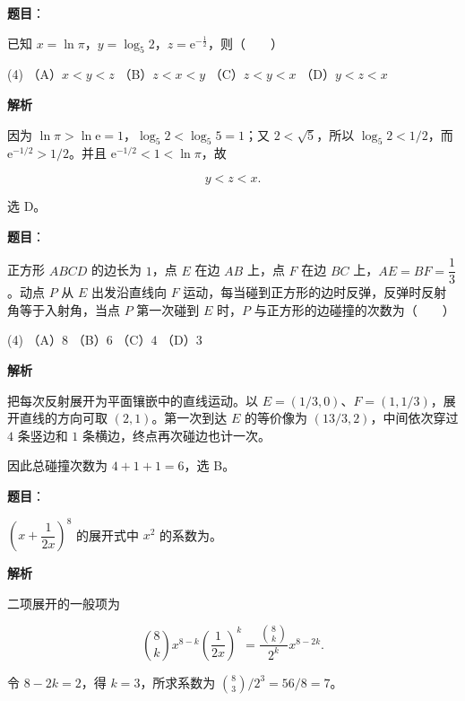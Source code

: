 \begin{answer}

\textbf{题目}：

已知 $x=\ln\pi$，$y=\log_5 2$，$z=\mathrm e^{-\frac12}$，则\mbox{（　　）}

\begin{gkopts}(4)
\task （A）$x<y<z$
\task （B）$z<x<y$
\task （C）$z<y<x$
\task （D）$y<z<x$
\end{gkopts}

\textbf{解析}

因为 $\ln\pi>\ln\mathrm e=1$，$\log_5 2<\log_5 5=1$；又 $2<\sqrt5$，所以 $\log_5 2<1/2$，而 $\mathrm e^{-1/2}>1/2$。并且 $\mathrm e^{-1/2}<1<\ln\pi$，故

\nopagebreak[4]
\[
y<z<x.
\]

选 D。


\end{answer}
\begin{answer}

\textbf{题目}：

正方形 $ABCD$ 的边长为 $1$，点 $E$ 在边 $AB$ 上，点 $F$ 在边 $BC$ 上，$AE=BF=\dfrac13$。动点 $P$ 从 $E$ 出发沿直线向 $F$ 运动，每当碰到正方形的边时反弹，反弹时反射角等于入射角，当点 $P$ 第一次碰到 $E$ 时，$P$ 与正方形的边碰撞的次数为\mbox{（　　）}

\begin{gkopts}(4)
\task （A）$8$
\task （B）$6$
\task （C）$4$
\task （D）$3$
\end{gkopts}

\textbf{解析}

把每次反射展开为平面镶嵌中的直线运动。以 $E=(1/3,0)$、$F=(1,1/3)$，展开直线的方向可取 $(2,1)$。第一次到达 $E$ 的等价像为 $(13/3,2)$，中间依次穿过 $4$ 条竖边和 $1$ 条横边，终点再次碰边也计一次。

因此总碰撞次数为 $4+1+1=6$，选 B。


\end{answer}
\begin{answer}

\textbf{题目}：

$\left(x+\dfrac1{2x}\right)^8$ 的展开式中 $x^2$ 的系数为\underline{\hspace{2cm}}。

\textbf{解析}

二项展开的一般项为

\nopagebreak[4]
\[
\binom8k x^{8-k}\left(\frac1{2x}\right)^k
=\frac{\binom8k}{2^k}x^{8-2k}.
\]

令 $8-2k=2$，得 $k=3$，所求系数为 $\binom83/2^3=56/8=7$。


\end{answer}
